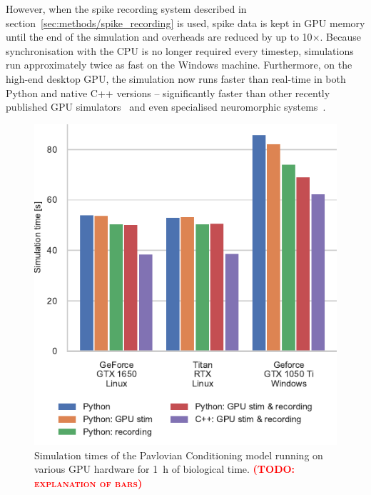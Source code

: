 \documentclass[utf8]{frontiersSCNS} %
\newcommand{\todo}[1]{\textbf{\textsc{\textcolor{red}{(TODO: #1)}}}}
\begin{document}
However, when the spike recording system described in section~\ref{sec:methods/spike_recording} is used, spike data is kept in GPU memory until the end of the simulation and overheads are reduced by up to 10$\times$.
Because synchronisation with the CPU is no longer required every timestep, simulations run approximately twice as fast on the Windows machine.
Furthermore, on the high-end desktop GPU, the simulation now runs faster than real-time in both Python and native C++ versions -- significantly faster than other recently published GPU simulators~\citep{Golosio2020} and even specialised neuromorphic systems~\citep{Rhodes2019}.
%
\begin{figure}[t!]
    \begin{center}
        \includegraphics{figures/izhikevich.pdf}
    \end{center}
    \caption{Simulation times of the Pavlovian Conditioning model running on various GPU hardware for \SI{1}{\hour} of biological time.
             \todo{explanation of bars}}
    \label{fig:izhikevich}
\end{figure}
%
\end{document}
